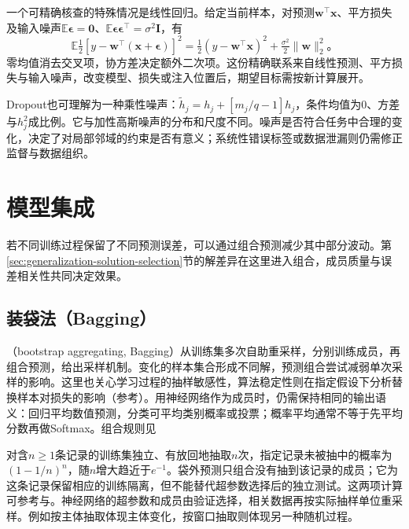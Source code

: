 一个可精确核查的特殊情况是线性回归。给定当前样本，对预测$\bm w^{\top}\bm x$、平方损失及输入噪声$\mathbb E\bm\epsilon=\bm0$、$\mathbb E\bm\epsilon\bm\epsilon^{\top}=\sigma^2\bm I$，有
\begin{equation}
  \mathbb E\tfrac12[y-\bm w^{\top}(\bm x+\bm\epsilon)]^2
  =\tfrac12(y-\bm w^{\top}\bm x)^2+\tfrac{\sigma^2}{2}\lVert\bm w\rVert_2^2\text{。}
  \label{eq:generalization-linear-noise}
\end{equation}
零均值消去交叉项，协方差决定额外二次项。这份精确联系来自线性预测、平方损失与输入噪声，改变模型、损失或注入位置后，期望目标需按新计算展开。

Dropout也可理解为一种乘性噪声：$\tilde h_j=h_j+[m_j/q-1]h_j$，条件均值为0、方差与$h_j^2$成比例。它与加性高斯噪声的分布和尺度不同。噪声是否符合任务中合理的变化，决定了对局部邻域的约束是否有意义；系统性错误标签或数据泄漏则仍需修正监督与数据组织。

\section{模型集成}
\label{sec:generalization-ensembles}

若不同训练过程保留了不同预测误差，可以通过组合预测减少其中部分波动。第\ref{sec:generalization-solution-selection}节的解差异在这里进入组合，成员质量与误差相关性共同决定效果。

\subsection{装袋法（Bagging）}
\label{sec:generalization-bagging}

（bootstrap aggregating, Bagging）从训练集多次自助重采样，分别训练成员，再组合预测，给出采样机制。变化的样本集合形成不同解，预测组合尝试减弱单次采样的影响。这里也关心学习过程的抽样敏感性，算法稳定性则在指定假设下分析替换样本对损失的影响（参考）。用神经网络作为成员时，仍需保持相同的输出语义：回归平均数值预测，分类可平均类别概率或投票；概率平均通常不等于先平均分数再做Softmax。组合规则见

对含$n\geq1$条记录的训练集独立、有放回地抽取$n$次，指定记录未被抽中的概率为$(1-1/n)^n$，随$n$增大趋近于$e^{-1}$。袋外预测只组合没有抽到该记录的成员；它为这条记录保留相应的训练隔离，但不能替代超参数选择后的独立测试。这两项计算可参考与。神经网络的超参数和成员由验证选择，相关数据再按实际抽样单位重采样。例如按主体抽取体现主体变化，按窗口抽取则体现另一种随机过程。

